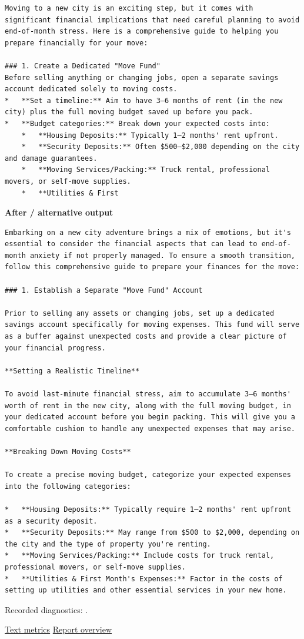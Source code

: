 \begin{Verbatim}
Moving to a new city is an exciting step, but it comes with significant financial implications that need careful planning to avoid end-of-month stress. Here is a comprehensive guide to helping you prepare financially for your move:

### 1. Create a Dedicated "Move Fund"
Before selling anything or changing jobs, open a separate savings account dedicated solely to moving costs.
*   **Set a timeline:** Aim to have 3–6 months of rent (in the new city) plus the full moving budget saved up before you pack.
*   **Budget categories:** Break down your expected costs into:
    *   **Housing Deposits:** Typically 1–2 months' rent upfront.
    *   **Security Deposits:** Often $500–$2,000 depending on the city and damage guarantees.
    *   **Moving Services/Packing:** Truck rental, professional movers, or self-move supplies.
    *   **Utilities & First
\end{Verbatim}

\textbf{After / alternative output}

\begin{Verbatim}
Embarking on a new city adventure brings a mix of emotions, but it's essential to consider the financial aspects that can lead to end-of-month anxiety if not properly managed. To ensure a smooth transition, follow this comprehensive guide to prepare your finances for the move:

### 1. Establish a Separate "Move Fund" Account

Prior to selling any assets or changing jobs, set up a dedicated savings account specifically for moving expenses. This fund will serve as a buffer against unexpected costs and provide a clear picture of your financial progress.

**Setting a Realistic Timeline**

To avoid last-minute financial stress, aim to accumulate 3–6 months' worth of rent in the new city, along with the full moving budget, in your dedicated account before you begin packing. This will give you a comfortable cushion to handle any unexpected expenses that may arise.

**Breaking Down Moving Costs**

To create a precise moving budget, categorize your expected expenses into the following categories:

*   **Housing Deposits:** Typically require 1–2 months' rent upfront as a security deposit.
*   **Security Deposits:** May range from $500 to $2,000, depending on the city and the type of property you're renting.
*   **Moving Services/Packing:** Include costs for truck rental, professional movers, or self-move supplies.
*   **Utilities & First Month's Expenses:** Factor in the costs of setting up utilities and other essential services in your new home.
\end{Verbatim}

Recorded diagnostics:
\texttt{}.

\href{records/docs/watermarking/text.tex}{Text metrics} \textbar{}
\href{../docs/watermarking/README.md}{Report overview}
